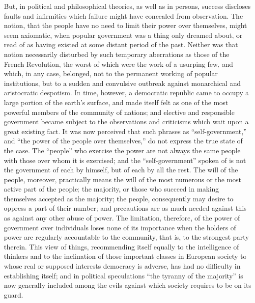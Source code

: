 \documentclass[11pt,openany]{book}
\begin{document}
But, in political and philosophical theories, as well as in persons, success discloses faults and infirmities which failure might have concealed from observation. The notion, that the people have no need to limit their power over themselves, might seem axiomatic, when popular government was a thing only dreamed about, or read of as having existed at some distant period of the past. Neither was that notion necessarily disturbed by such temporary aberrations as those of the French Revolution, the worst of which were the work of a usurping few, and which, in any case, belonged, not to the permanent working of popular institutions, but to a sudden and convulsive outbreak against monarchical and aristocratic despotism. In time, however, a democratic republic came to occupy a large portion of the earth's surface, and made itself felt as one of the most powerful members of the community of nations; and elective and responsible government became subject to the observations and criticisms which wait upon a great existing fact. It was now perceived that such phrases as ``self-government,'' and ``the power of the people over themselves,'' do not express the true state of the case. The ``people'' who exercise the power are not always the same people with those over whom it is exercised; and the ``self-government'' spoken of is not the government of each by himself, but of each by all the rest. The will of the people, moreover, practically means the will of the most numerous or the most active part of the people; the majority, or those who succeed in making themselves accepted as the majority; the people, consequently may desire to oppress a part of their number; and precautions are as much needed against this as against any other abuse of power. The limitation, therefore, of the power of government over individuals loses none of its importance when the holders of power are regularly accountable to the community, that is, to the strongest party therein. This view of things, recommending itself equally to the intelligence of thinkers and to the inclination of those important classes in European society to whose real or supposed interests democracy is adverse, has had no difficulty in establishing itself; and in political speculations ``the tyranny of the majority'' is now generally included among the evils against which society requires to be on its guard.
\end{document}
